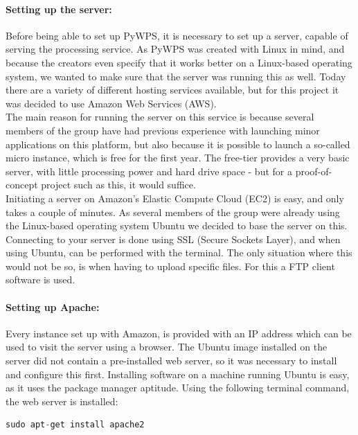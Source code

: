 \paragraph{Setting up the server:}Before being able to set up PyWPS, it is necessary to set up a server, capable of serving the processing service.  
As PyWPS was created with Linux in mind, and because the creators even specify that it works better on a Linux-based operating system, we wanted to make sure that the server was running this as well. Today there are a variety of different hosting services available, but for this project it was decided to use Amazon Web Services (AWS).\\
The main reason for running the server on this service is because several members of the group have had previous experience with launching minor applications on this platform, but also because it is possible to launch a so-called micro instance, which is free for the first year. The free-tier provides a very basic server, with little processing power and hard drive space - but for a proof-of-concept project such as this, it would suffice. \\
Initiating a server on Amazon's Elastic Compute Cloud (EC2) is easy, and only takes a couple of minutes. As several members of the group were already using the Linux-based operating system Ubuntu we decided to base the server on this.\\
Connecting to your server is done using SSL (Secure Sockets Layer), and when using Ubuntu, can be performed with the terminal. The only situation where this would not be so, is when having to upload specific files. For this a FTP client software is used.

\paragraph{Setting up Apache:}Every instance set up with Amazon, is provided with an IP address which can be used to visit the server using a browser. The Ubuntu image installed on the server did not contain a pre-installed web server, so it was necessary to install and configure this first.
Installing software on a machine running Ubuntu is easy, as it uses the package manager aptitude. Using the following terminal command, the web server is installed:

\begin{lstlisting}[language=Python]
sudo apt-get install apache2 
\end{lstlisting}

